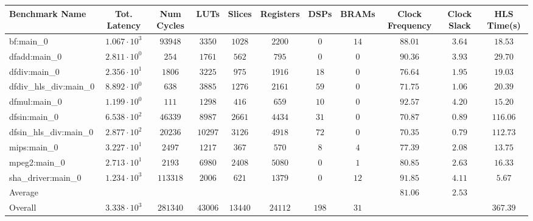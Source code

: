 \begin{tabular}{|l|c|c|c|c|c|c|c|c|c|c|}
\hline
Benchmark Name          & Tot. Latency           & Num Cycles & LUTs      & Slices    & Registers & DSPs    & BRAMs  & Clock Frequency & Clock Slack & HLS Time(s) \\
\hline
bf:main\_0              & $ 1.067 \cdot 10^{3} $ & $ 93948  $ & $ 3350  $ & $ 1028  $ & $ 2200  $ & $ 0   $ & $ 14 $ & $ 88.01       $ & $ 3.64    $ & $ 18.53   $ \\
dfadd:main\_0           & $ 2.811 \cdot 10^{0} $ & $ 254    $ & $ 1761  $ & $ 562   $ & $ 795   $ & $ 0   $ & $ 0  $ & $ 90.36       $ & $ 3.93    $ & $ 29.70   $ \\
dfdiv:main\_0           & $ 2.356 \cdot 10^{1} $ & $ 1806   $ & $ 3225  $ & $ 975   $ & $ 1916  $ & $ 18  $ & $ 0  $ & $ 76.64       $ & $ 1.95    $ & $ 19.03   $ \\
dfdiv\_hls\_div:main\_0 & $ 8.892 \cdot 10^{0} $ & $ 638    $ & $ 3885  $ & $ 1276  $ & $ 2161  $ & $ 59  $ & $ 0  $ & $ 71.75       $ & $ 1.06    $ & $ 20.39   $ \\
dfmul:main\_0           & $ 1.199 \cdot 10^{0} $ & $ 111    $ & $ 1298  $ & $ 416   $ & $ 659   $ & $ 10  $ & $ 0  $ & $ 92.57       $ & $ 4.20    $ & $ 15.20   $ \\
dfsin:main\_0           & $ 6.538 \cdot 10^{2} $ & $ 46339  $ & $ 8987  $ & $ 2661  $ & $ 4434  $ & $ 31  $ & $ 0  $ & $ 70.87       $ & $ 0.89    $ & $ 116.06  $ \\
dfsin\_hls\_div:main\_0 & $ 2.877 \cdot 10^{2} $ & $ 20236  $ & $ 10297 $ & $ 3126  $ & $ 4918  $ & $ 72  $ & $ 0  $ & $ 70.35       $ & $ 0.79    $ & $ 112.73  $ \\
mips:main\_0            & $ 3.227 \cdot 10^{1} $ & $ 2497   $ & $ 1217  $ & $ 367   $ & $ 570   $ & $ 8   $ & $ 4  $ & $ 77.39       $ & $ 2.08    $ & $ 13.75   $ \\
mpeg2:main\_0           & $ 2.713 \cdot 10^{1} $ & $ 2193   $ & $ 6980  $ & $ 2408  $ & $ 5080  $ & $ 0   $ & $ 1  $ & $ 80.85       $ & $ 2.63    $ & $ 16.33   $ \\
sha\_driver:main\_0     & $ 1.234 \cdot 10^{3} $ & $ 113318 $ & $ 2006  $ & $ 621   $ & $ 1379  $ & $ 0   $ & $ 12 $ & $ 91.85       $ & $ 4.11    $ & $ 5.67    $ \\
\hline
Average                 & $                    $ & $        $ & $       $ & $       $ & $       $ & $     $ & $    $ & $ 81.06       $ & $ 2.53    $ & $         $ \\
\hline
Overall                 & $ 3.338 \cdot 10^{3} $ & $ 281340 $ & $ 43006 $ & $ 13440 $ & $ 24112 $ & $ 198 $ & $ 31 $ & $             $ & $         $ & $ 367.39  $ \\
\hline
\end{tabular}
